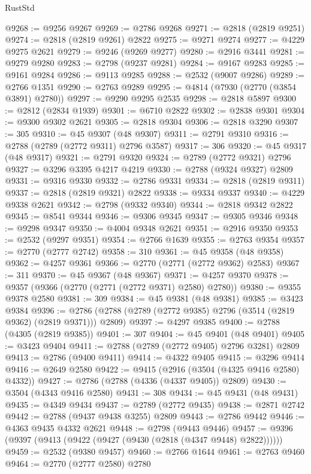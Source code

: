 \begin{lexlean}{RustStd}
\begin{coremodule}
@9268 := @9256 @9267
@9269 := @2786 @9268
@9271 := @2818 (@2819 @9251)
@9274 := @2818 (@2819 @9261) @2822
@9275 := @9271 @9274
@9277 := @4229 @9275 @2621
@9279 := @9246 (@9269 @9277)
@9280 := @2916 @3441
@9281 := @9279 @9280
@9283 := @2798 (@9237 @9281)
@9284 := @9167 @9283
@9285 := @9161 @9284
@9286 := @9113 @9285
@9288 := @2532 (@9007 @9286)
@9289 := @2766 @1351
@9290 := @2763 @9289
@9295 := @4814 (@7930 (@2770 (@3854 @3891) @2780))
@9297 := @9290 @9295 @2535
@9298 := @2818 @5897
@9300 := @2812 (@2834 @1939)
@9301 := @6710 @2822
@9302 := @2838 @9301
@9304 := @9300 @9302 @2621
@9305 := @2818 @9304
@9306 := @2818 @3290
@9307 := 305
@9310 := @45 @9307 (@48 @9307)
@9311 := @2791 @9310
@9316 := @2788 (@2789 (@2772 @9311) @2796 @3587)
@9317 := 306
@9320 := @45 @9317 (@48 @9317)
@9321 := @2791 @9320
@9324 := @2789 (@2772 @9321) @2796
@9327 := @3296 @3395 @4217 @4219
@9330 := @2788 (@9324 @9327) @2809
@9331 := @9316 @9330
@9332 := @2786 @9331
@9334 := @2818 (@2819 @9311)
@9337 := @2818 (@2819 @9321) @2822
@9338 := @9334 @9337
@9340 := @4229 @9338 @2621
@9342 := @2798 (@9332 @9340)
@9344 := @2818 @9342 @2822
@9345 := @8541 @9344
@9346 := @9306 @9345
@9347 := @9305 @9346
@9348 := @9298 @9347
@9350 := @4004 @9348 @2621
@9351 := @2916 @9350
@9353 := @2532 (@9297 @9351)
@9354 := @2766 @1639
@9355 := @2763 @9354
@9357 := @2770 (@2777 @2742)
@9358 := 310
@9361 := @45 @9358 (@48 @9358)
@9362 := @4257 @9361
@9366 := @2770 (@2771 (@2772 @9362) @2583)
@9367 := 311
@9370 := @45 @9367 (@48 @9367)
@9371 := @4257 @9370
@9378 := @9357 (@9366 (@2770 (@2771 (@2772 @9371) @2580) @2780))
@9380 := @9355 @9378 @2580
@9381 := 309
@9384 := @45 @9381 (@48 @9381)
@9385 := @3423 @9384
@9396 := @2786 (@2788 (@2789 (@2772 @9385) @2796 (@3514 (@2819 @9362) (@2819 @9371))) @2809)
@9397 := @4297 @9385
@9400 := @2788 (@4305 (@2819 @9385))
@9401 := 307
@9404 := @45 @9401 (@48 @9401)
@9405 := @3423 @9404
@9411 := @2788 (@2789 (@2772 @9405) @2796 @3281) @2809
@9413 := @2786 (@9400 @9411)
@9414 := @4322 @9405
@9415 := @3296 @9414
@9416 := @2649 @2580
@9422 := @9415 (@2916 (@3504 (@4325 @9416 @2580) @4332))
@9427 := @2786 (@2788 (@4336 (@4337 @9405)) @2809)
@9430 := @3504 (@4343 @9416 @2580)
@9431 := 308
@9434 := @45 @9431 (@48 @9431)
@9435 := @4349 @9434
@9437 := @2789 (@2772 @9435)
@9438 := @2871 @2742
@9442 := @2788 (@9437 @9438 @3255) @2809
@9443 := @2786 @9442
@9446 := @4363 @9435 @4332 @2621
@9448 := @2798 (@9443 @9446)
@9457 := @9396 (@9397 (@9413 (@9422 (@9427 (@9430 (@2818 (@4347 @9448) @2822))))))
@9459 := @2532 (@9380 @9457)
@9460 := @2766 @1644
@9461 := @2763 @9460
@9464 := @2770 (@2777 @2580) @2780

\end{coremodule}
\end{lexlean}
